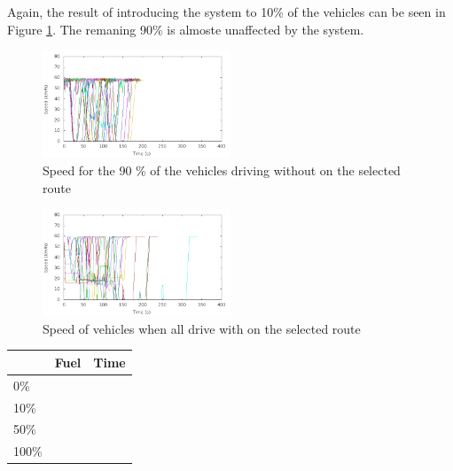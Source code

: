 Again, the result of introducing the system to 10\% of the vehicles can be seen in Figure \ref{fig:TestResults:speedUnC10}. 
The remaning 90\% is almoste unaffected by the system.

\begin{figure}[H]
\includegraphics[width=0.5\textwidth]{../images/tp0c1_0/speedUncontrolled10.png}
\caption{Speed for the 90 \% of the vehicles driving without \tech on the selected route}
\label{fig:TestResults:speedUnC10}
\end{figure}

\begin{figure}[H]
\includegraphics[width=0.5\textwidth]{../images/tp0c1_0/speedControlled100.png}
\caption{Speed of vehicles when all drive with \tech on the selected route}
\label{fig:TestResults:speed100}
\end{figure}

\begin{tabular}{|l|ll|}\hline
						& Fuel 	& Time\\\hline
\multirow{2}{*}{0\%}	&		&	\\
						&		&	\\\hline
\multirow{2}{*}{10\%}	&		&	\\
						&		&	\\\hline
\multirow{2}{*}{50\%}	&		&	\\
						&		&	\\\hline
\multirow{2}{*}{100\%}	&		&	\\
						&		&	\\\hline
\end{tabular}
